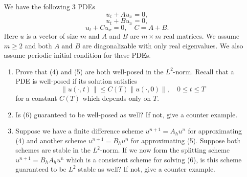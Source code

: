 \begin{exercise}
\label{applied:2010:12}
We have the following 3 PDEs
\[
u_t + A u_x = 0, \tag{4}
\]
\[
u_t + B u_x = 0, \tag{5}
\]
\[
u_t + C u_x = 0, \quad C = A + B. \tag{6}
\]
Here $u$ is a vector of size $m$ and $A$ and $B$ are $m \times m$ real matrices. We assume $m \geq 2$ and both $A$ and $B$ are diagonalizable with only real eigenvalues. We also assume periodic initial condition for these PDEs.

\begin{enumerate}
    \item Prove that (4) and (5) are both well-posed in the $L^2$-norm. Recall that a PDE is well-posed if its solution satisfies
    \[
    \|u(\cdot, t)\| \leq C(T) \|u(\cdot, 0)\|, \quad 0 \leq t \leq T
    \]
    for a constant $C(T)$ which depends only on $T$.
    \item Is (6) guaranteed to be well-posed as well? If not, give a counter example.
    \item Suppose we have a finite difference scheme $u^{n+1} = A_h u^n$ for approximating (4) and another scheme $u^{n+1} = B_h u^n$ for approximating (5). Suppose both schemes are stable in the $L^2$-norm. If we now form the splitting scheme $u^{n+1} = B_h A_h u^n$ which is a consistent scheme for solving (6), is this scheme guaranteed to be $L^2$ stable as well? If not, give a counter example.
\end{enumerate}
\end{exercise}

